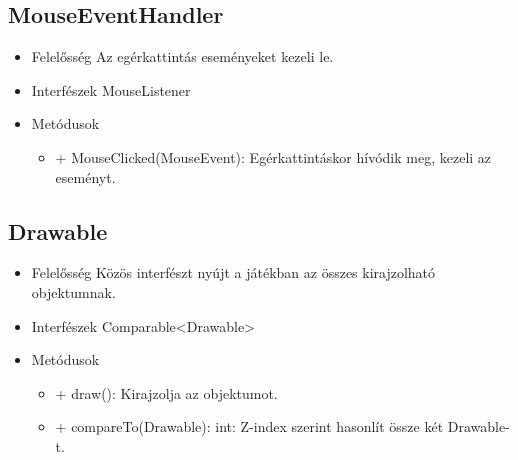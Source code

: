 \subsection{MouseEventHandler}
\begin{itemize}
\item Felelősség\newline
Az egérkattintás eseményeket kezeli le.
\item Interfészek\newline
MouseListener
\item Metódusok\newline
	\begin{itemize}
		\item + MouseClicked(MouseEvent): Egérkattintáskor hívódik meg, kezeli az eseményt.
	\end{itemize}
\end{itemize}

\subsection{Drawable}
\begin{itemize}
\item Felelősség\newline
Közös interfészt nyújt a játékban az összes kirajzolható objektumnak.
\item Interfészek\newline
Comparable<Drawable>
\item Metódusok\newline
	\begin{itemize}
		\item + draw(): Kirajzolja az objektumot.
		\item + compareTo(Drawable): int: Z-index szerint hasonlít össze két Drawable-t.
	\end{itemize}
\end{itemize}

